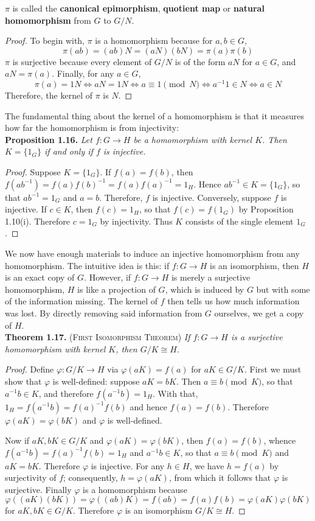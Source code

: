 \documentclass[leqno]{book}
\begin{document}
\noindent $\pi$ is called the \textbf{canonical epimorphism}, \textbf{quotient map} or \textbf{natural homomorphism} from $G$ to $G/N$.
\begin{proof}
To begin with, $\pi$ is a homomorphism because for $a,b\in G$,
$$\pi(ab)=(ab)N=(aN)(bN)=\pi(a)\pi(b)$$
$\pi$ is surjective because every element of $G/N$ is of the form $aN$ for $a\in G$, and $aN=\pi(a)$.  Finally, for any $a\in G$,
$$\pi(a)=1N\iff aN=1N\iff a\equiv 1\pmod N\iff a^{-1}1\in N\iff a\in N$$
Therefore, the kernel of $\pi$ is $N$.
\end{proof}

\noindent The fundamental thing about the kernel of a homomorphism is that it measures how far the homomorphism is from injectivity:\\

\noindent\textbf{Proposition 1.16.} \emph{Let $f:G\to H$ be a homomorphism with kernel $K$.  Then $K=\{1_G\}$ if and only if $f$ is injective.}
\begin{proof}
Suppose $K=\{1_G\}$.  If $f(a)=f(b)$, then $f(ab^{-1})=f(a)f(b)^{-1}=f(a)f(a)^{-1}=1_H$.  Hence $ab^{-1}\in K=\{1_G\}$, so that $ab^{-1}=1_G$ and $a=b$.  Therefore, $f$ is injective.  Conversely, suppose $f$ is injective.  If $c\in K$, then $f(c)=1_H$, so that $f(c)=f(1_G)$ by Proposition 1.10(i).  Therefore $c=1_G$ by injectivity.  Thus $K$ consists of the single element $1_G$.
\end{proof}

\noindent We now have enough materials to induce an injective homomorphism from any homomorphism.  The intuitive idea is this: if $f:G\to H$ is an isomorphism, then $H$ is an exact copy of $G$.  However, if $f:G\to H$ is merely a surjective homomorphism, $H$ is like a projection of $G$, which is induced by $G$ but with some of the information missing.  The kernel of $f$ then tells us how much information was lost.  By directly removing said information from $G$ ourselves, we get a copy of $H$.\\

\noindent\textbf{Theorem 1.17.} (\textsc{First Isomorphism Theorem}) \emph{If $f:G\to H$ is a surjective homomorphism with kernel $K$, then $G/K\cong H$.}
\begin{proof}
Define $\varphi:G/K\to H$ via $\varphi(aK)=f(a)$ for $aK\in G/K$.  First we must show that $\varphi$ is well-defined: suppose $aK=bK$.  Then $a\equiv b\pmod K$, so that $a^{-1}b\in K$, and therefore $f(a^{-1}b)=1_H$.  With that, $1_H=f(a^{-1}b)=f(a)^{-1}f(b)$ and hence $f(a)=f(b)$.  Therefore $\varphi(aK)=\varphi(bK)$ and $\varphi$ is well-defined.

Now if $aK,bK\in G/K$ and $\varphi(aK)=\varphi(bK)$, then $f(a)=f(b)$, whence $f(a^{-1}b)=f(a)^{-1}f(b)=1_H$ and $a^{-1}b\in K$, so that $a\equiv b\pmod K$ and $aK=bK$.  Therefore $\varphi$ is injective.  For any $h\in H$, we have $h=f(a)$ by surjectivity of $f$; consequently, $h=\varphi(aK)$, from which it follows that $\varphi$ is surjective.  Finally $\varphi$ is a homomorphism because
$$\varphi((aK)(bK))=\varphi((ab)K)=f(ab)=f(a)f(b)=\varphi(aK)\varphi(bK)$$
for $aK,bK\in G/K$.  Therefore $\varphi$ is an isomorphism $G/K\cong H$.
\end{proof}
\end{document}
